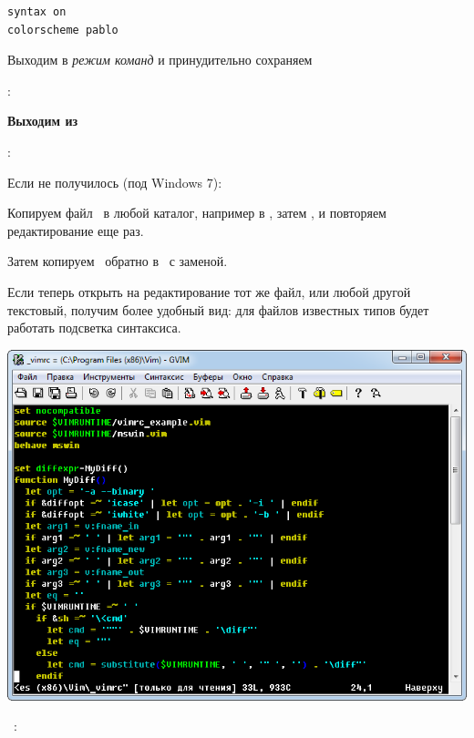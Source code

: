 \begin{lstlisting}
syntax on
colorscheme pablo
\end{lstlisting}
\bigskip

Выходим в \emph{режим команд} и принудительно сохраняем

:\keys{!}
\bigskip

\textbf{Выходим из \vim}

:\keys{!}

\bigskip
Если не получилось (под Windows 7):

\bigskip
{}
\bigskip

Копируем файл \ в любой каталог, например в ,
затем , и повторяем редактирование еще раз.

\bigskip
Затем копируем \ обратно в \ с
заменой.

\bigskip
Если теперь открыть на редактирование тот же файл, или любой другой текстовый,
получим более удобный вид: для файлов известных типов будет работать подсветка
синтаксиса.

\nopagebreak\bigskip
\includegraphics[height=0.7\textheight]{ide/vim28.png}


\ :\ \keys{!}\ \ 


\ \ 

